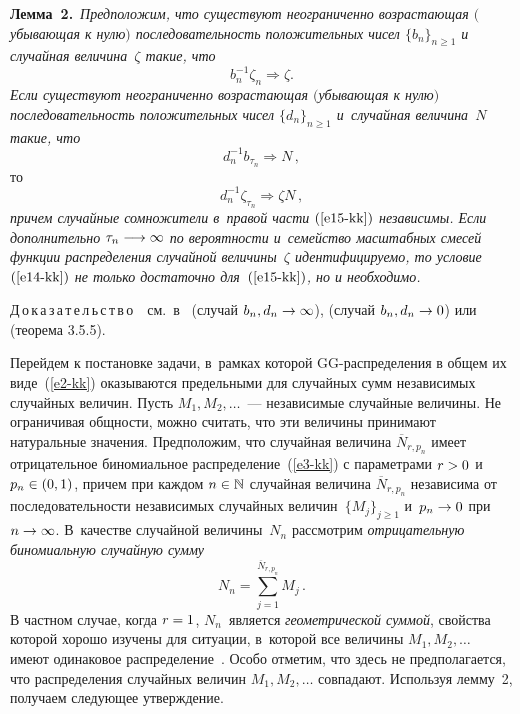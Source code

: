 \begin{multicols}{2}
\noindent
\textbf{Лемма~2.}\ \textit{Предположим, что существуют неограниченно
возрастающая $($убывающая к нулю$)$ последовательность положительных
чисел $\{b_n\}_{n\geqslant1}$ и случайная величина~$\zeta$ такие, что}
$$
b_n^{-1}\zeta_n\Longrightarrow\zeta.
$$
\textit{Если существуют неограниченно возрастающая $($убывающая к нулю$)$
последовательность по\-ло\-жи\-тельных чисел $\{d_n\}_{n\geqslant1}$ 
и~случайная величина~$N$ такие, что}
\begin{equation}
d_n^{-1}b_{\tau_n}\Longrightarrow N\,,\label{e14-kk}
\end{equation}
то
\begin{equation}
d_n^{-1}\zeta_{\tau_n}\Longrightarrow \zeta N\,,\label{e15-kk}
\end{equation}
\textit{причем случайные сомножители в~правой части $(\ref{e15-kk})$ независимы. Если
дополнительно $\tau_n\hm\longrightarrow\infty$ по вероятности 
и~семейство масштабных смесей функции распределения случайной величины~$\zeta$ 
идентифици\-ру\-емо, то условие~$(\ref{e14-kk})$ не только достаточно для~$(\ref{e15-kk})$, 
но и необходимо.}

\smallskip

\noindent
Д\,о\,к\,а\,з\,а\,т\,е\,л\,ь\,с\,т\,в\,о\ \ см.~в~\cite{Korolev1994} (случай
$b_n,d_n\hm\to\infty$), \cite{Korolev1995} (случай $b_n,d_n\hm\to 0$) 
или~\cite{BeningKorolev2002} (теорема 3.5.5).

\smallskip

Перейдем к постановке задачи, в~рамках которой GG-распределения в
общем их виде~(\ref{e2-kk}) оказываются предельными для случайных сумм
независи\-мых случайных величин. Пусть $M_1,M_2,\ldots$~--- независимые
случайные величины. Не ограничивая общности, можно считать, что эти
величины принимают натуральные значения. Предположим, что случайная
величина $\overline N_{r,p_n}$ имеет отрицательное биномиальное
распределение~(\ref{e3-kk}) с параметрами $r\hm>0$ и $p_n\hm\in(0,1)$, причем при
каж\-дом $n\hm\in\mathbb{N}$ случайная величина $\overline N_{r,p_n}$
независима от последовательности независимых случайных величин~$\{M_j\}_{j\geqslant1}$ 
и~$p_n\hm\to 0$ при $n\hm\to\infty$. В~качестве
случайной величины~$N_n$ рассмотрим {\it отрицательную биномиальную
случайную сумму}
\begin{equation}
N_n=\sum\limits_{j=1}^{\overline N_{r,p_n}}M_j\,.\label{e16-kk}
\end{equation}
В частном случае, когда $r\hm=1$, $N_n$~является {\it геометрической
суммой}, свойства которой хорошо изучены для ситуации, в~которой все
величины $M_1,M_2,\ldots$ имеют одинаковое распределение~\cite{Kalashnikov1997}. 
Особо отметим, что здесь не предполагается,
что распределения случайных величин $M_1,M_2,\ldots$ совпадают.
Используя лемму~2, получаем следующее утверждение.


\end{multicols}
